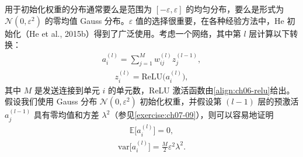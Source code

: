 \documentclass[../../main.tex]{subfiles}
\begin{document}
用于初始化权重的分布通常要么是范围为 $[-\varepsilon,\varepsilon]$ 的均匀分布，要么是形式为 $\mathcal{N}(0,\varepsilon^{2})$ 的零均值 Gauss 分布。$\varepsilon$ 值的选择很重要，在各种经验方法中，He 初始化（He et al., 2015b）得到了广泛使用。考虑一个网络，其中第 $l$ 层计算以下转换：
\begin{align}
a_i^{(l)} = \sum_{j=1}^{M}w_{ij}^{(l)}z_j^{(l-1)},
\label{align:ch07-前向计算}
\end{align}
\begin{align}
z_i^{(l)} = \mathrm{ReLU}\bigl(a_i^{(l)}\bigr),
\label{align:ch07-激活函数}
\end{align}
其中 $M$ 是发送连接到单元 $i$ 的单元数，ReLU 激活函数由\eqref{align:ch06-relu}给出。假设我们使用 Gauss 分布 $\mathcal{N}(0,\varepsilon^{2})$ 初始化权重，并假设第 $(l-1)$ 层的预激活 $a_j^{(l-1)}$ 具有零均值和方差 $\lambda^{2}$（参见\cref{exercise:ch07-09}），则可以容易地证明
\begin{align}
\mathbb{E}\bigl[a_i^{(l)}\bigr] = 0,
\label{align:ch07-初始化均值}
\end{align}
\begin{align}
\mathrm{var}\bigl[a_i^{(l)}\bigr] = \frac{M}{2}\varepsilon^{2}\lambda^{2}.
\label{align:ch07-初始化方差}
\end{align}
\end{document}
